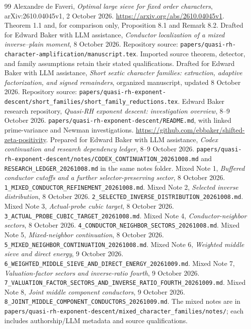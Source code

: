 \documentclass[11pt]{article}
\theoremstyle{definition}
\begin{document}
\begin{thebibliography}{99}
 Alexandre de Faveri, \emph{Optimal large sieve for fixed order characters}, arXiv:2610.04045v1, 2 October 2026. \url{https://arxiv.org/abs/2610.04045v1}. Theorem 1.1 and, for comparison only, Proposition 8.1 and Remark 8.2.
 Drafted for Edward Baker with LLM assistance, \emph{Conductor localization of a mixed inverse--plain moment}, 8 October 2026. Repository source: \nolinkurl{papers/quasi-rh-character-amplification/manuscript.tex}. Imported source theorem, detector, and family assumptions retain their stated qualifications.
 Drafted for Edward Baker with LLM assistance, \emph{Short sextic character families: extraction, adaptive factorization, and signed remainders}, organized manuscript, updated 8 October 2026. Repository source: \nolinkurl{papers/quasi-rh-exponent-descent/short_families/short_family_reductions.tex}.
 Edward Baker research repository, \emph{Quasi-RH exponent descent: investigation overview}, 8--9 October 2026. \nolinkurl{papers/quasi-rh-exponent-descent/README.md}, with linked prime-variance and Newman investigations. \url{https://github.com/ebbaker/shifted-zeta-positivity}.
 Prepared for Edward Baker with LLM assistance, \emph{Codex continuation and research dependency ledger}, 8--9 October 2026. \nolinkurl{papers/quasi-rh-exponent-descent/notes/CODEX_CONTINUATION_20261008.md} and \nolinkurl{RESEARCH_LEDGER_20261008.md} in the same notes folder.
 Mixed Note 1, \emph{Buffered conductor cutoffs and a further selector-preserving sector}, 8 October 2026. \nolinkurl{1_MIXED_CONDUCTOR_REFINEMENT_20261008.md}.
 Mixed Note 2, \emph{Selected inverse distribution}, 8 October 2026. \nolinkurl{2_SELECTED_INVERSE_DISTRIBUTION_20261008.md}.
 Mixed Note 3, \emph{Actual-probe cubic target}, 8 October 2026. \nolinkurl{3_ACTUAL_PROBE_CUBIC_TARGET_20261008.md}.
 Mixed Note 4, \emph{Conductor-neighbor sectors}, 8 October 2026. \nolinkurl{4_CONDUCTOR_NEIGHBOR_SECTORS_20261008.md}.
 Mixed Note 5, \emph{Mixed-neighbor continuation}, 8 October 2026. \nolinkurl{5_MIXED_NEIGHBOR_CONTINUATION_20261008.md}.
 Mixed Note 6, \emph{Weighted middle sieve and direct energy}, 9 October 2026. \nolinkurl{6_WEIGHTED_MIDDLE_SIEVE_AND_DIRECT_ENERGY_20261009.md}.
 Mixed Note 7, \emph{Valuation-factor sectors and inverse-ratio fourth}, 9 October 2026. \nolinkurl{7_VALUATION_FACTOR_SECTORS_AND_INVERSE_RATIO_FOURTH_20261009.md}.
 Mixed Note 8, \emph{Joint middle component conductors}, 9 October 2026. \nolinkurl{8_JOINT_MIDDLE_COMPONENT_CONDUCTORS_20261009.md}. The mixed notes are in \nolinkurl{papers/quasi-rh-exponent-descent/mixed_character_families/notes/}; each includes authorship/LLM metadata and source qualifications.

\end{thebibliography}
\end{document}
